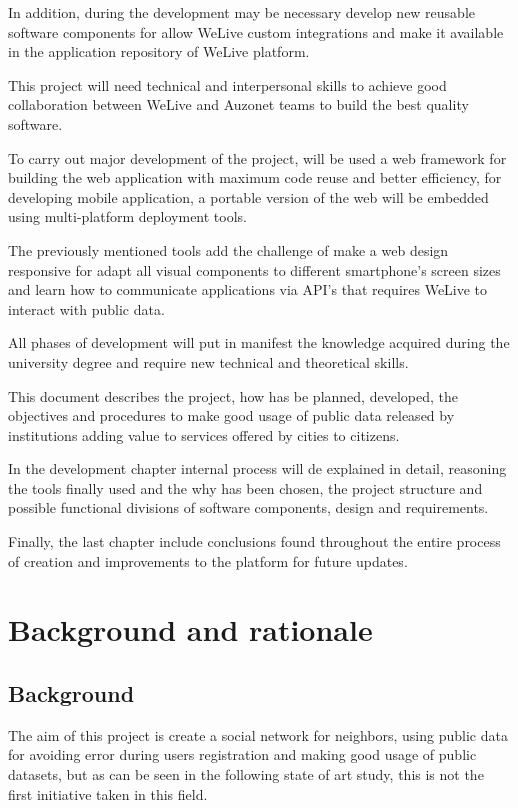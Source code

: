 \documentclass{DeustoFDP}
\begin{document}
In addition, during the development may be necessary develop new reusable software components for allow WeLive custom integrations and make it available in the application repository of WeLive platform.

This project will need technical and interpersonal skills to achieve good collaboration between WeLive and Auzonet teams to build the best quality software.

To carry out major development of the project, will be used a web framework for building the web application with maximum code reuse and better efficiency, for developing mobile application, a portable version of the web will be embedded using multi-platform deployment tools.

The previously mentioned tools add the challenge of make a web design responsive for adapt all visual components to different smartphone's screen sizes  and learn how to communicate applications via API's that requires WeLive to interact with public data.

All phases of development will put in manifest the knowledge acquired during the university degree and require new technical and theoretical skills.

This document describes the project, how has be planned, developed, the objectives and procedures to make good usage of public data released by institutions adding value to services offered by cities to citizens.

In the development chapter internal process will de explained in detail, reasoning the tools finally used and the why has been chosen, the project structure and possible functional divisions of software components, design and requirements.


Finally, the last chapter include conclusions found throughout the entire process of creation and improvements to the platform for future updates.

\chapter{Background and rationale}\label{cha:backgroundandrationale}
\section{Background}
The aim of this project is create a social network for neighbors, using public data for avoiding error during users registration and making good usage of public datasets, but as can be seen in the following state of art study, this is not the first initiative taken in this field.
\end{document}
